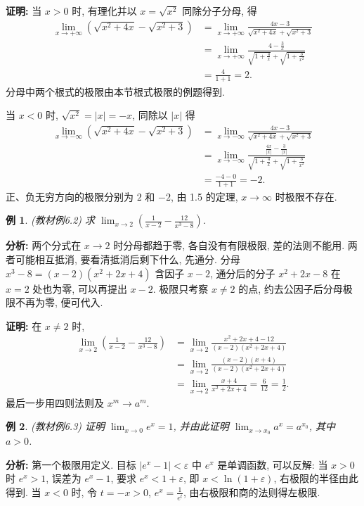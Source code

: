 \documentclass[UTF8,openany]{ctexbook}
\theoremstyle{chinesetextbook}
\newtheorem{example}{例}[section]
\newenvironment{cnproof}{\par\indent\textbf{证明:} \ignorespaces}{\par}
\begin{document}
\begin{cnproof}
当 $x>0$ 时, 有理化并以 $x=\sqrt{x^2}$ 同除分子分母, 得
\[
\begin{aligned}
\lim_{x\to+\infty}\left(\sqrt{x^2+4x}-\sqrt{x^2+3}\right)
&=\lim_{x\to+\infty}\frac{4x-3}{\sqrt{x^2+4x}+\sqrt{x^2+3}}\\
&=\lim_{x\to+\infty}\frac{4-\frac3x}{\sqrt{1+\frac4x}+\sqrt{1+\frac3{x^2}}}\\
&=\frac{4}{1+1}=2.
\end{aligned}
\]
分母中两个根式的极限由本节根式极限的例题得到.

当 $x<0$ 时, $\sqrt{x^2}=|x|=-x$, 同除以 $|x|$ 得
\[
\begin{aligned}
\lim_{x\to-\infty}\left(\sqrt{x^2+4x}-\sqrt{x^2+3}\right)
&=\lim_{x\to-\infty}\frac{4x-3}{\sqrt{x^2+4x}+\sqrt{x^2+3}}\\
&=\lim_{x\to-\infty}\frac{\frac{4x}{|x|}-\frac3{|x|}}{\sqrt{1+\frac4x}+\sqrt{1+\frac3{x^2}}}\\
&=\frac{-4-0}{1+1}=-2.
\end{aligned}
\]
正、负无穷方向的极限分别为 $2$ 和 $-2$, 由 1.5 的定理, $x\to\infty$ 时极限不存在.
\end{cnproof}
\begin{example}
\textnormal{(教材例6.2)} 求 $\displaystyle \lim_{x\to2}\left(\frac1{x-2}-\frac{12}{x^3-8}\right)$.
\end{example}
\par\indent\textbf{分析:} 两个分式在 $x\to2$ 时分母都趋于零, 各自没有有限极限, 差的法则不能用. 两者可能相互抵消, 要看清抵消后剩下什么, 先通分. 分母 $x^3-8=(x-2)(x^2+2x+4)$ 含因子 $x-2$, 通分后的分子 $x^2+2x-8$ 在 $x=2$ 处也为零, 可以再提出 $x-2$. 极限只考察 $x\ne2$ 的点, 约去公因子后分母极限不再为零, 便可代入.
\begin{cnproof}
在 $x\ne2$ 时,
\[
\begin{aligned}
\lim_{x\to2}\left(\frac1{x-2}-\frac{12}{x^3-8}\right)
&=\lim_{x\to2}\frac{x^2+2x+4-12}{(x-2)(x^2+2x+4)}\\
&=\lim_{x\to2}\frac{(x-2)(x+4)}{(x-2)(x^2+2x+4)}\\
&=\lim_{x\to2}\frac{x+4}{x^2+2x+4}
=\frac6{12}=\frac12.
\end{aligned}
\]
最后一步用四则法则及 $x^m\to a^m$.
\end{cnproof}
\begin{example}
\textnormal{(教材例6.3)} 证明 $\displaystyle \lim_{x\to0}e^x=1$, 并由此证明 $\displaystyle \lim_{x\to x_0}a^x=a^{x_0}$, 其中 $a>0$.
\end{example}
\par\indent\textbf{分析:} 第一个极限用定义. 目标 $|e^x-1|<\varepsilon$ 中 $e^x$ 是单调函数, 可以反解: 当 $x>0$ 时 $e^x>1$, 误差为 $e^x-1$, 要求 $e^x<1+\varepsilon$, 即 $x<\ln(1+\varepsilon)$, 右极限的半径由此得到. 当 $x<0$ 时, 令 $t=-x>0$, $\displaystyle e^x=\frac1{e^t}$, 由右极限和商的法则得左极限.
\end{document}
